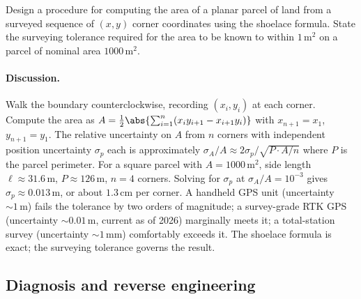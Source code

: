 \begin{exercise}
Design a procedure for computing the area of a planar parcel of
land from a surveyed sequence of $(x, y)$ corner coordinates using
the shoelace formula. State the surveying tolerance required for
the area to be known to within $1 \,\si{\meter\squared}$ on a
parcel of nominal area $1000 \,\si{\meter\squared}$.

\paragraph{Discussion.} Walk the boundary counterclockwise, recording
$(x_{i}, y_{i})$ at each corner. Compute the area as
$A = \tfrac{1}{2}\abs{\sum_{i = 1}^{n}(x_{i} y_{i+1} - x_{i+1}
y_{i})}$ with $x_{n+1} = x_{1}$, $y_{n+1} = y_{1}$. The relative
uncertainty on $A$ from $n$ corners with independent position
uncertainty $\sigma_{p}$ each is approximately $\sigma_{A}/A \approx
2\sigma_{p}/\sqrt{P\cdot A/n}$ where $P$ is the parcel perimeter.
For a square parcel with $A = 1000\,\si{\meter\squared}$, side
length $\ell \approx 31.6\,\si{\meter}$, $P \approx 126\,\si{\meter}$,
$n = 4$ corners. Solving for $\sigma_{p}$ at $\sigma_{A}/A = 10^{-3}$
gives $\sigma_{p} \approx 0.013\,\si{\meter}$, or about $1.3\,
\si{\centi\meter}$ per corner. A handheld GPS unit (uncertainty
$\sim 1\,\si{\meter}$) fails the tolerance by two orders of
magnitude; a survey-grade RTK GPS (uncertainty $\sim 0.01\,\si{
\meter}$, current as of 2026) marginally meets it; a total-station
survey (uncertainty $\sim 1\,\si{\milli\meter}$) comfortably
exceeds it. The shoelace formula is exact; the surveying tolerance
governs the result.
\end{exercise}

\subsection*{Diagnosis and reverse engineering}

